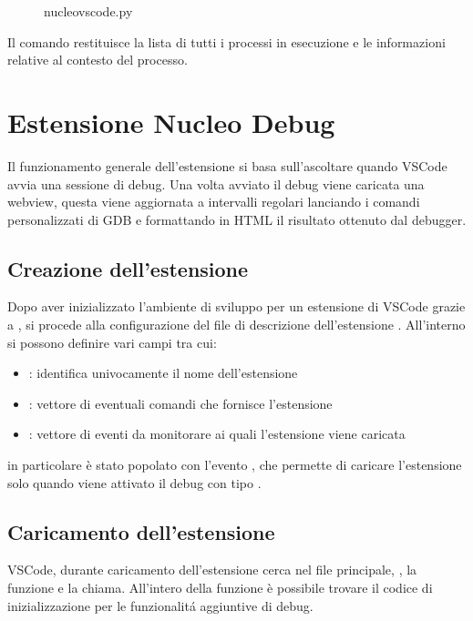 \begin{figure}[H]
    
    \caption{nucleo\textunderscore vscode.py}
\end{figure}

Il comando  restituisce la lista di tutti i processi in esecuzione e le informazioni relative al contesto del processo.

\section{Estensione Nucleo Debug}
Il funzionamento generale dell'estensione si basa sull'ascoltare quando VSCode avvia una sessione di debug. Una volta avviato il debug viene caricata una webview, questa viene aggiornata a intervalli regolari lanciando i comandi personalizzati di GDB e formattando in HTML il risultato ottenuto dal debugger. 

\subsection{Creazione dell'estensione}
Dopo aver inizializzato l'ambiente di sviluppo per un estensione di VSCode grazie a , si procede alla configurazione del file di descrizione dell'estensione . All'interno si possono definire vari campi tra cui:

\begin{itemize}
    \item {}: identifica univocamente il nome dell'estensione
    \item {}: vettore di eventuali comandi che fornisce l'estensione 
    \item {}: vettore di eventi da monitorare ai quali l'estensione viene caricata
\end{itemize}

in particolare  è stato popolato con l'evento \linebreak {}, che permette di caricare l'estensione solo quando viene attivato il debug con tipo .

\subsection{Caricamento dell'estensione}
VSCode, durante caricamento dell'estensione cerca nel file principale, \linebreak {}, la funzione  e la chiama. All'intero della funzione è possibile trovare il codice di inizializzazione per le funzionalitá aggiuntive di debug.

